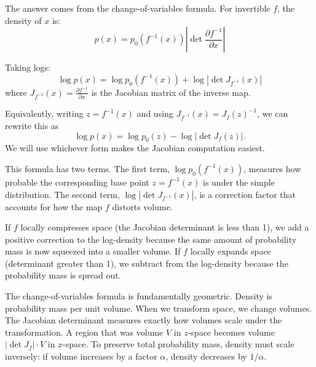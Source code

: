 \vspace{0.3cm}

The answer comes from the change-of-variables formula. For invertible $f$, the density of $x$ is:
%
\begin{equation}
p(x) = p_0(f^{-1}(x)) \left| \det \frac{\partial f^{-1}}{\partial x} \right|
\end{equation}

\vspace{0.3cm}

Taking logs:
%
\begin{equation}
\log p(x) = \log p_0(f^{-1}(x)) + \log \left| \det J_{f^{-1}}(x) \right|
\end{equation}
%
where $J_{f^{-1}}(x) = \frac{\partial f^{-1}}{\partial x}$ is the Jacobian matrix of the inverse map.

\vspace{0.3cm}

Equivalently, writing $z=f^{-1}(x)$ and using $J_{f^{-1}}(x)=J_f(z)^{-1}$, we can rewrite this as
%
\begin{equation}
\log p(x)=\log p_0(z) - \log|\det J_f(z)|.
\end{equation}
%
We will use whichever form makes the Jacobian computation easiest.

\vspace{0.3cm}

This formula has two terms. The first term, $\log p_0(f^{-1}(x))$, measures how probable the corresponding base point $z = f^{-1}(x)$ is under the simple distribution. The second term, $\log |\det J_{f^{-1}}(x)|$, is a correction factor that accounts for how the map $f$ distorts volume.

\vspace{0.3cm}

If $f$ locally compresses space (the Jacobian determinant is less than 1), we add a positive correction to the log-density because the same amount of probability mass is now squeezed into a smaller volume. If $f$ locally expands space (determinant greater than 1), we subtract from the log-density because the probability mass is spread out.

\vspace{1.5em}

\begin{geometrylens}
The change-of-variables formula is fundamentally geometric. Density is probability mass per unit volume. When we transform space, we change volumes. The Jacobian determinant measures exactly how volumes scale under the transformation. A region that was volume $V$ in $z$-space becomes volume $|\det J_f| \cdot V$ in $x$-space. To preserve total probability mass, density must scale inversely: if volume increases by a factor $\alpha$, density decreases by $1/\alpha$.
\end{geometrylens}

